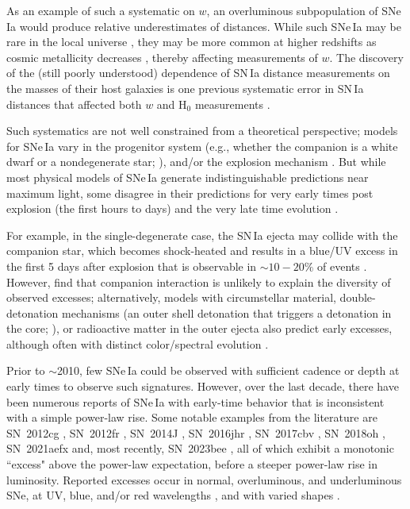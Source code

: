 \documentclass[twocolumn,twocolappendix, linenumbers]{aastex631} %
\begin{document}
 
As an example of such a systematic on $w$, an overluminous subpopulation of SNe\,Ia would produce relative underestimates of distances. While such SNe\,Ia may be rare in the local universe \citep{Desai23}, they may be more common at higher redshifts as cosmic metallicity decreases \citep[e.g.,][]{Dominguez01}, thereby affecting measurements of $w$.  The discovery of the (still poorly understood) dependence of SN\,Ia distance measurements on the masses of their host galaxies \citep{Kelly10,Lampeitl10,Sullivan10} is one previous systematic error in SN\,Ia distances that affected both $w$ and H$_0$ measurements \citep{Sullivan11,Riess16}.

Such systematics are not well constrained from a theoretical perspective; models for SNe\,Ia vary in the progenitor system (e.g., whether the companion is a white dwarf or a nondegenerate star; \citealp{Whelan73,Iben84,Webbink84,Livne90,Nomoto97}), and/or the explosion mechanism \citep[e.g.,][]{Whelan73,Nomoto80,Iben84,Woosley94,Hoeflich96,Piersanti03,vanKerkwijk10,Diamond18}. But while most physical models of SNe\,Ia generate indistinguishable predictions near maximum light, some disagree in their predictions for very early times post explosion (the first hours to days) and the very late time evolution \citep[e.g.,][]{Ashall19,Kumar23}. 

For example, in the single-degenerate case, the SN\,Ia ejecta may collide with the companion star, which becomes shock-heated and results in a blue/UV excess in the first 5 days after explosion that is observable in $\sim 10-20\%$ of events \citep{Marietta00,Kasen10,Burke22a,Burke22b,Deckers22}.  However, \citet{Hoogendam23} find that companion interaction is unlikely to explain the diversity of observed excesses; alternatively, models with circumstellar material, double-detonation mechanisms (an outer shell detonation that triggers a detonation in the core; \citealp{Fink07}), or radioactive matter in the outer ejecta \citep[e.g.,][]{Jiang18} also predict early excesses, although often with distinct color/spectral evolution \citep{Piro12,Piro16,Contreras18,Maeda18,Polin19,Magee20a,Magee20b}.

Prior to $\sim$2010, few SNe\,Ia could be observed with sufficient cadence or depth at early times to observe such signatures. However, over the last decade, there have been numerous reports of SNe\,Ia with early-time behavior that is inconsistent with a simple power-law rise. Some notable examples from the literature are SN~2012cg \citep[but also see \citealp{Shappee18}]{Marion16}, SN~2012fr \citep{Contreras18}, SN~2014J \citep{Goobar15,Siverd15}, SN~2016jhr \citep{Jiang17}, SN~2017cbv \citep{Hosseinzadeh17}, SN~2018oh \citep{Dimitriadis19,Li19,Shappee19}, SN~2021aefx \citep{Ashall22,Hosseinzadeh22} and, most recently, SN~2023bee \citep{Hosseinzadeh23,Wang23}, all of which exhibit a monotonic ``excess" above the power-law expectation, before a steeper power-law rise in luminosity. Reported excesses occur in normal, overluminous, and underluminous SNe, at UV, blue, and/or red wavelengths \citep[e.g.,]{Stritzinger18}, and with varied shapes \citep[e.g.,][]{Fausnaugh23}.
\end{document}
